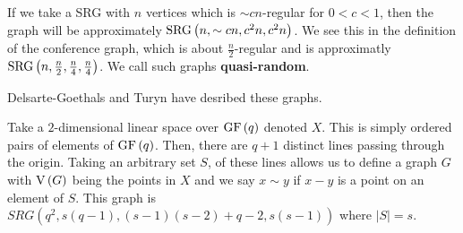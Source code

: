 \begin{remark}
	If we take a SRG with \(n\) vertices which is \( \sim cn\)-regular for \(0 < c < 1\), then the graph will be approximately \(\operatorname{SRG}\left( n, \sim cn, c^2n, c^2n \right) \). We see this in the definition of the conference graph, which is about \(\frac{n}{2}\)-regular and is approximatly \(\operatorname{SRG}\left( n, \frac{n}{2}, \frac{n}{4}, \frac{n}{4} \right) \). We call such graphs \textbf{quasi-random}.
\end{remark}
\begin{remark}
	Delsarte-Goethals and Turyn have desribed these graphs.
\end{remark}
\begin{definition}[]
	Take a \(2\)-dimensional linear space over \(\operatorname{GF}\left( q \right) \) denoted \(X\). This is simply ordered pairs of elements of \(\operatorname{GF}\left( q \right) \). Then, there are \(q+1\) distinct lines passing through the origin. Taking an arbitrary set \(S\), of these lines allows us to define a graph \(G\) with \(\operatorname{V}\left( G \right) \) being the points in \(X\) and we say \(x \sim y\) if \(x-y\) is a point on an element of \(S\). This graph is  \(SRG\left( q^2, s\left( q-1 \right) , \left( s-1 \right) \left( s-2 \right) +q-2, s\left( s-1 \right)  \right) \) where \(\left| S \right| = s\).
\end{definition}
